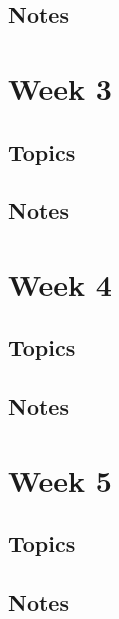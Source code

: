 \documentclass[12pt]{article}
\begin{document}
\subsection{Notes}



\section{Week 3}

\subsection{Topics}

\subsection{Notes}





\section{Week 4}

\subsection{Topics}

\subsection{Notes}





\section{Week 5}

\subsection{Topics}

\subsection{Notes}
\end{document}
